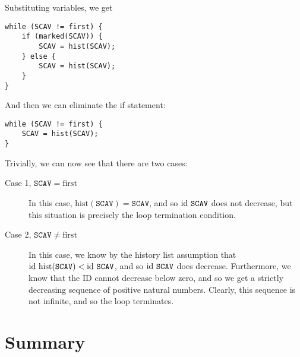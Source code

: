 Substituting variables, we get

\begin{lstlisting}
while (SCAV != first) {
    if (marked(SCAV)) {
        SCAV = hist(SCAV);
    } else {
        SCAV = hist(SCAV);
    }
}
\end{lstlisting}

And then we can eliminate the if statement:

\begin{lstlisting}
while (SCAV != first) {
    SCAV = hist(SCAV);
}
\end{lstlisting}

Trivially, we can now see that there are two cases:

\begin{description}
  \item[Case 1, $\mathtt{SCAV} = \mathrm{first}$] In this case,
    $\mathrm{hist}(\mathtt{SCAV}) = \mathtt{SCAV}$, and so
    $\mathrm{id}~\mathtt{SCAV}$ does not decrease, but this situation is
    precisely the loop termination condition.

  \item[Case 2, $\mathtt{SCAV} \neq \mathrm{first}$] In this case, we
    know by the history list assumption that
    $\mathrm{id}~\mathrm{hist}(\mathtt{SCAV}) < \mathrm{id}~\mathtt{SCAV}$, and so
    $\mathrm{id}~\mathtt{SCAV}$ does decrease. Furthermore, we know that the
    ID cannot decrease below zero, and so we get a strictly decreasing
    sequence of positive natural numbers. Clearly, this sequence is
    not infinite, and so the loop terminates.
\end{description}

\section{Summary}

